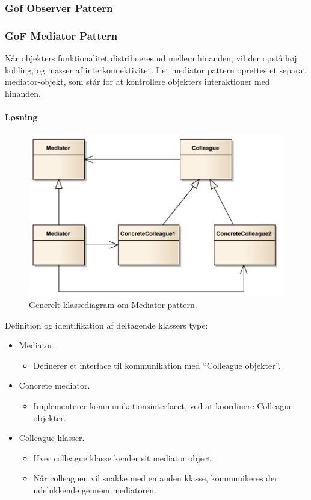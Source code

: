 \subsubsection{Gof Observer Pattern}

\subsubsection{GoF Mediator Pattern}
Når objekters funktionalitet distribueres ud mellem hinanden, vil der opstå høj kobling, og masser af interkonnektivitet.  I et mediator pattern oprettes et separat mediator-objekt, som står for at kontrollere objekters interaktioner med hinanden. 

\paragraph{Løsning}

\begin{figure}[h]
	\centering
	\includegraphics[width=0.8\linewidth]{figs/spm5/concrete}
	\caption{Generelt klassediagram om Mediator pattern.}
	\label{fig:concrete}
\end{figure}

Definition og identifikation af deltagende klassers type:

\begin{itemize}
	\item Mediator.
	\begin{itemize}
		\item 	Definerer et interface til kommunikation med “Colleague objekter”.
	\end{itemize}
	\item Concrete mediator.
	\begin{itemize}
		\item 	Implementerer kommunikationsinterfacet, ved at koordinere Colleague objekter.
	\end{itemize}
	\item Colleague klasser.
	\begin{itemize}
		\item Hver colleague klasse kender sit mediator object.
		\item Når colleaguen vil snakke med en anden klasse, kommunikeres der udelukkende gennem mediatoren.
	\end{itemize}
\end{itemize}

